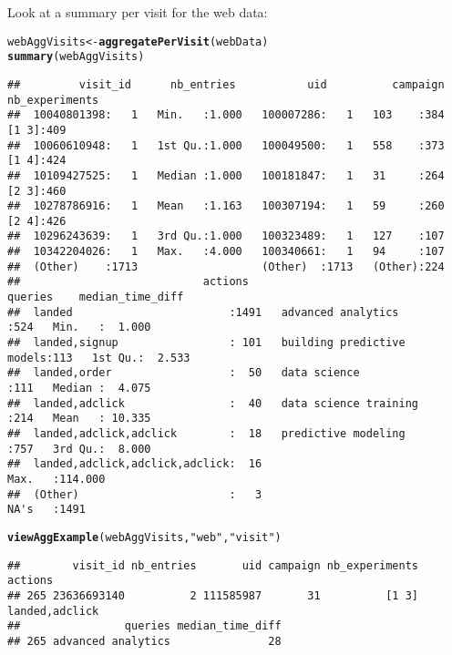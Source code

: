 \documentclass{article}\usepackage[]{graphicx}\usepackage[]{color}
\makeatletter
\newcommand{\hlstr}[1]{\textcolor[rgb]{0.192,0.494,0.8}{#1}}%
\newcommand{\hlstd}[1]{\textcolor[rgb]{0.345,0.345,0.345}{#1}}%
\newcommand{\hlkwb}[1]{\textcolor[rgb]{0.69,0.353,0.396}{#1}}%
\newcommand{\hlkwd}[1]{\textcolor[rgb]{0.737,0.353,0.396}{\textbf{#1}}}%
\newenvironment{kframe}{%
 \def\at@end@of@kframe{}%
 \ifinner\ifhmode%
  \def\at@end@of@kframe{\end{minipage}}%
  \begin{minipage}{\columnwidth}%
 \fi\fi%
 \def\FrameCommand##1{\hskip\@totalleftmargin \hskip-\fboxsep
 \colorbox{shadecolor}{##1}\hskip-\fboxsep
     \hskip-\linewidth \hskip-\@totalleftmargin \hskip\columnwidth}%
 \MakeFramed {\advance\hsize-\width
   \@totalleftmargin\z@ \linewidth\hsize
   \@setminipage}}%
 {\par\unskip\endMakeFramed%
 \at@end@of@kframe}
\newenvironment{knitrout}{}{} %
\makeatother
\begin{document}
Look at a summary per visit for the web data:
\begin{knitrout}
\color{fgcolor}\begin{kframe}
\begin{alltt}
\hlstd{webAggVisits} \hlkwb{<-} \hlkwd{aggregatePerVisit}\hlstd{(webData)}
\hlkwd{summary}\hlstd{(webAggVisits)}
\end{alltt}
\begin{verbatim}
##         visit_id      nb_entries           uid          campaign   nb_experiments
##  10040801398:   1   Min.   :1.000   100007286:   1   103    :384   [1 3]:409     
##  10060610948:   1   1st Qu.:1.000   100049500:   1   558    :373   [1 4]:424     
##  10109427525:   1   Median :1.000   100181847:   1   31     :264   [2 3]:460     
##  10278786916:   1   Mean   :1.163   100307194:   1   59     :260   [2 4]:426     
##  10296243639:   1   3rd Qu.:1.000   100323489:   1   127    :107                 
##  10342204026:   1   Max.   :4.000   100340661:   1   94     :107                 
##  (Other)    :1713                   (Other)  :1713   (Other):224                 
##                            actions                           queries    median_time_diff 
##  landed                        :1491   advanced analytics        :524   Min.   :  1.000  
##  landed,signup                 : 101   building predictive models:113   1st Qu.:  2.533  
##  landed,order                  :  50   data science              :111   Median :  4.075  
##  landed,adclick                :  40   data science training     :214   Mean   : 10.335  
##  landed,adclick,adclick        :  18   predictive modeling       :757   3rd Qu.:  8.000  
##  landed,adclick,adclick,adclick:  16                                    Max.   :114.000  
##  (Other)                       :   3                                    NA's   :1491
\end{verbatim}
\begin{alltt}
\hlkwd{viewAggExample}\hlstd{(webAggVisits,} \hlstr{"web"}\hlstd{,} \hlstr{"visit"}\hlstd{)}
\end{alltt}
\begin{verbatim}
##        visit_id nb_entries       uid campaign nb_experiments        actions
## 265 23636693140          2 111585987       31          [1 3] landed,adclick
##                queries median_time_diff
## 265 advanced analytics               28
\end{verbatim}
\end{kframe}
\end{knitrout}
\end{document}
